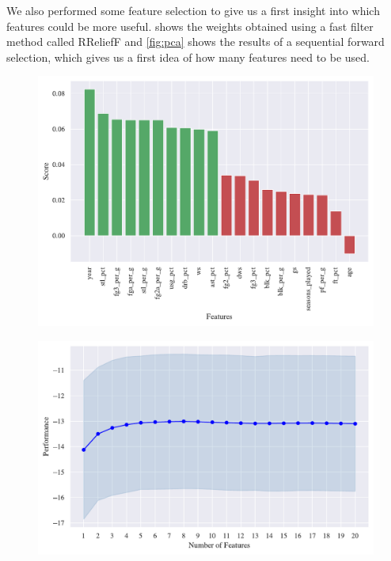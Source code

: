 We also performed some feature selection to give us a first insight into which features could be more useful.  shows the weights obtained using a fast filter method called RReliefF and \cref{fig:pca} shows the results of a sequential forward selection, which gives us a first idea of how many features need to be used.

\begin{figure}[H]
\centering
\begin{minipage}{.5\textwidth}
  \centering
  \includegraphics[width=1.0\linewidth]{figures/relief.pdf}
  \label{fig:relief}
\end{minipage}%
\begin{minipage}{.5\textwidth}
  \centering
  \includegraphics[width=1.0\linewidth]{figures/sfs.pdf}
  \label{fig:sfs}
\end{minipage}
\end{figure}

